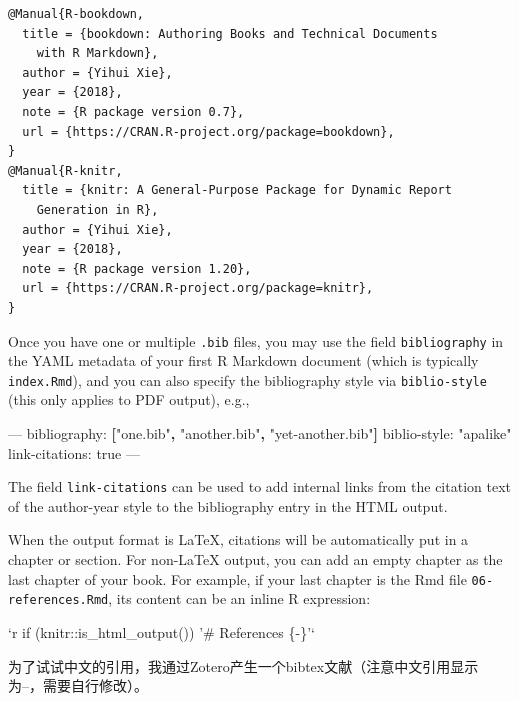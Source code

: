 \documentclass[]{article}
\newenvironment{Shaded}{\begin{snugshade}}{\end{snugshade}}
\newcommand{\AttributeTok}[1]{\textcolor[rgb]{0.77,0.63,0.00}{#1}}
\newcommand{\BaseNTok}[1]{\textcolor[rgb]{0.00,0.00,0.81}{#1}}
\newcommand{\FunctionTok}[1]{\textcolor[rgb]{0.00,0.00,0.00}{#1}}
\newcommand{\KeywordTok}[1]{\textcolor[rgb]{0.13,0.29,0.53}{\textbf{#1}}}
\newcommand{\OtherTok}[1]{\textcolor[rgb]{0.56,0.35,0.01}{#1}}
\newcommand{\StringTok}[1]{\textcolor[rgb]{0.31,0.60,0.02}{#1}}
\begin{document}
\begin{verbatim}
@Manual{R-bookdown,
  title = {bookdown: Authoring Books and Technical Documents
    with R Markdown},
  author = {Yihui Xie},
  year = {2018},
  note = {R package version 0.7},
  url = {https://CRAN.R-project.org/package=bookdown},
}
@Manual{R-knitr,
  title = {knitr: A General-Purpose Package for Dynamic Report
    Generation in R},
  author = {Yihui Xie},
  year = {2018},
  note = {R package version 1.20},
  url = {https://CRAN.R-project.org/package=knitr},
}
\end{verbatim}

Once you have one or multiple \texttt{.bib} files, you may use the field
\texttt{bibliography} in the YAML metadata of your first R Markdown
document (which is typically \texttt{index.Rmd}), and you can also
specify the bibliography style via \texttt{biblio-style} (this only
applies to PDF output), e.g.,

\begin{Shaded}
\begin{Highlighting}[]
\OtherTok{---}
\FunctionTok{bibliography:}\AttributeTok{ }\KeywordTok{[}\StringTok{"one.bib"}\KeywordTok{,} \StringTok{"another.bib"}\KeywordTok{,} \StringTok{"yet-another.bib"}\KeywordTok{]}
\FunctionTok{biblio-style:}\AttributeTok{ }\StringTok{"apalike"}
\FunctionTok{link-citations:}\AttributeTok{ true}
\OtherTok{---}
\end{Highlighting}
\end{Shaded}

The field \texttt{link-citations} can be used to add internal links from
the citation text of the author-year style to the bibliography entry in
the HTML output.

When the output format is LaTeX, citations will be automatically put in
a chapter or section. For non-LaTeX output, you can add an empty chapter
as the last chapter of your book. For example, if your last chapter is
the Rmd file \texttt{06-references.Rmd}, its content can be an inline R
expression:

\begin{Shaded}
\begin{Highlighting}[]
\BaseNTok{`r if (knitr::is_html_output()) '# References \{-\}'`}
\end{Highlighting}
\end{Shaded}

为了试试中文的引用，我通过Zotero产生一个bibtex文献（注意中文引用显示为--，需要自行修改）\citep{ke2017}。


\end{document}
